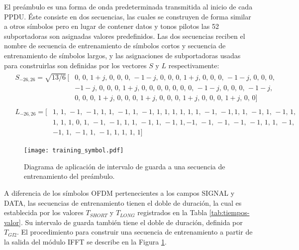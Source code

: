 El preámbulo es una forma de onda predeterminada transmitida al inicio de cada PPDU. Éste consiste en dos secuencias, las cuales se construyen de forma similar a otros símbolos pero en lugar de contener datos y tonos pilotos las 52 subportadoras son asignadas valores predefinidos. Las dos secuencias reciben el nombre de secuencia de entrenamiento de símbolos cortos y secuencia de entrenamiento de símbolos largos, y las asignaciones de subportadoras usadas para construirlas son definidas por los vectores $S$ y $L$ respectivamente:
\begin{align}
    &\begin{aligned}
        S_{-26,26} = \sqrt{13/6}\, 
        [&0 ,\,  0   ,\, 1+j ,\,  0   ,\, 0 ,\,  0   ,\, -1-j ,\,  0   ,\, 0 ,\, 0   ,\, 1+j ,\, 0   ,\, 0 ,\, 
         0 ,\, -1-j ,\, 0   ,\,  0   ,\, 0 ,\\ 
         &-1-j ,\,  0   ,\,  0   ,\, 0 ,\, 1+j ,\, 0   ,\, 0   ,\, 0 ,\, 0 ,\,
         0 ,\,  0   ,\, 0   ,\, -1-j ,\, 0 ,\,  0   ,\,  0   ,\, -1-j ,\\ 
         &0 ,\, 0   ,\, 0   ,\, 1+j ,\, 0 ,\, 
         0 ,\,  0   ,\, 1+j ,\,  0   ,\, 0 ,\,  0   ,\,  1+j ,\,  0   ,\, 0 ,\, 0   ,\, 1+j ,\, 0   ,\, 0]
    \end{aligned}\label{eq:def-S}\\
    &
    \begin{aligned}
        L_{-26,26} = 
        [&1,\, 1,\, -1,\, -1,\, 1,\, 1,\, -1,\, 1,\, -1,\, 1,\, 1,\, 1,\, 1,\, 1,\, 1,\, -1,\, -1, 1,\, 1,\, -1,\, 1,\, -1,\, 1,\\& 1,\, 1,\, 1,\, 
        0,\,
        1,\, -1,\, -1,\, 1,\, 1,\, -1,\, 1,\, -1,\, 1, -1,\, -1,\, -1,\, -1,\, -1,\, 1,\, 1,\, -1,\\& -1,\, 1,\, -1,\, 1,\, -1,\, 1,\, 1,\, 1,\, 1]
    \end{aligned}\label{eq:def-L}
\end{align}
\begin{figure}[t]
    \centering{}\texttt{[image: training\_symbol.pdf]}
    \caption{Diagrama de aplicación de intervalo de guarda a una secuencia de entrenamiento del preámbulo.\label{fig:training-symbol}}  
\end{figure}

A diferencia de los símbolos OFDM pertenecientes a los campos SIGNAL y DATA, las secuencias de entrenamiento tienen el doble de duración, la cual es establecida por los valores $T_{SHORT}$ y $T_{LONG}$ registrados en la Tabla \ref{tab:tiempos-valor}. Su intervalo de guarda también tiene el doble de duración, definida por $T_{GI2}$. El procedimiento para construir una secuencia de entrenamiento a partir de la salida del módulo IFFT se describe en la Figura \ref{fig:training-symbol}.

